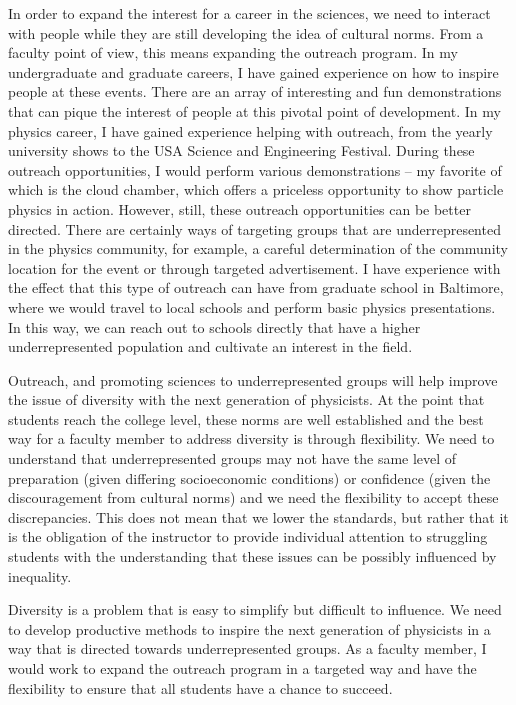 \documentclass[12pt]{article}
\begin{document}
In order to expand the interest for a career in the sciences, we need to
interact with people while they are still developing the idea of cultural norms.
From a faculty point of view, this means expanding the outreach
program. In my undergraduate and graduate careers, I have gained experience on how
to inspire people at these events.  There are an array of interesting and
fun demonstrations that can pique the interest of people at this pivotal point of
development. In my physics career, I have gained experience helping
with outreach, from the yearly university shows to the USA Science and Engineering Festival.
During these outreach opportunities, I would perform various demonstrations --
my favorite of which is the cloud chamber, which offers a priceless opportunity
to show particle physics in action.  However, still, these outreach opportunities
can be better directed. There are certainly ways of targeting groups that are
underrepresented in the physics community, for example, a careful
determination of the community location for the event or through
targeted advertisement.  I have experience with the effect that this type of
outreach can have from graduate school in Baltimore, where
we would travel to local schools and perform basic physics presentations. In
this way, we can reach out to schools directly that have a higher underrepresented
population and cultivate an interest in the field.

Outreach, and promoting sciences to underrepresented groups will help improve
the issue of diversity with the next generation of physicists.
At the point that students reach the college level, these norms are
well established and the best way for a faculty member to address diversity is through
flexibility.  We need to understand that underrepresented groups may not have the
same level of preparation (given differing socioeconomic conditions) or
confidence (given the discouragement from cultural norms) and we need the
flexibility to accept these discrepancies.  This does not mean that we
lower the standards, but rather that it is the obligation of the
instructor to provide individual attention to struggling students with the
understanding that these issues can be possibly influenced by inequality.

Diversity is a problem that is easy to simplify but difficult to influence. We
need to develop productive methods to inspire the next generation of physicists
in a way that is directed towards underrepresented groups. As a faculty member,
I would work to expand the outreach program in a targeted way and
have the flexibility to ensure that all students have a chance to succeed.
\end{document}
